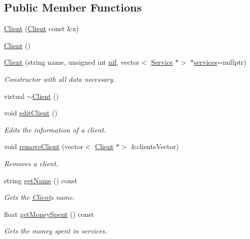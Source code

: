 \subsection*{Public Member Functions}
\begin{DoxyCompactItemize}
\item 
\hyperlink{class_client_ab3079953a67493b5da6ffb32d4f14ac7}{Client} (\hyperlink{class_client}{Client} const \&x)
\item 
\hyperlink{class_client_ae51af7aa6b8f591496a8f6a4a87a14bf}{Client} ()
\item 
\hyperlink{class_client_a3cdfb856b1cccd81052f589c850ab86f}{Client} (string name, unsigned int \hyperlink{class_client_a1c94dc96a56cb5032573fb1d528517c2}{nif}, vector$<$ \hyperlink{class_service}{Service} $\ast$$>$ $\ast$\hyperlink{class_client_a02b601f12b9905edae7e64ded9bde912}{services}=nullptr)
\begin{DoxyCompactList}\small\item\em Constructor with all data necessary. \end{DoxyCompactList}\item 
virtual \hyperlink{class_client_a840e519ca781888cbd54181572ebe3a7}{$\sim$\+Client} ()
\item 
void \hyperlink{class_client_afe8b004559fd1480fb8747c352f167db}{edit\+Client} ()
\begin{DoxyCompactList}\small\item\em Edits the information of a client. \end{DoxyCompactList}\item 
void \hyperlink{class_client_a7f845c33f4aa7b7081ae72d9a16c2d3f}{remove\+Client} (vector$<$ \hyperlink{class_client}{Client} $\ast$$>$ \&clients\+Vector)
\begin{DoxyCompactList}\small\item\em Removes a client. \end{DoxyCompactList}\item 
string \hyperlink{class_client_a5c473ba52d7678744edec9e51052c947}{get\+Name} () const
\begin{DoxyCompactList}\small\item\em Gets the \hyperlink{class_client}{Client}\textquotesingle{}s name. \end{DoxyCompactList}\item 
float \hyperlink{class_client_a226ff919591e7fdfa6c386e9aa5300a5}{get\+Money\+Spent} () const
\begin{DoxyCompactList}\small\item\em Gets the money spent in services. \end{DoxyCompactList}\item 

\end{DoxyCompactItemize}
